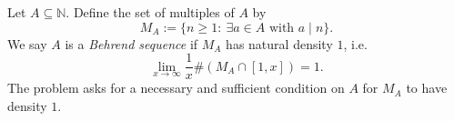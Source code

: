 Let $A\subseteq\mathbb{N}$. Define the set of multiples of $A$ by
\[
M_A:=\{n\ge 1:\ \exists a\in A\text{ with }a\mid n\}.
\]
We say $A$ is a \emph{Behrend sequence} if $M_A$ has natural density $1$, i.e.
\[
\lim_{x\to\infty}\frac{1}{x}\#(M_A\cap[1,x])=1.
\]
The problem asks for a necessary and sufficient condition on $A$ for $M_A$ to have density $1$.
